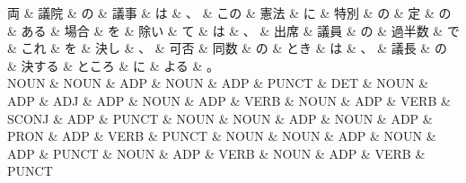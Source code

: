 \documentclass[tikz,border=5pt]{standalone}
\begin{document}
\small
\begin{dependency}[edge unit distance=10.4pt]
    \begin{deptext}[column sep=0.5em]
        両 \& 議院 \& の \& 議事 \& は \& 、 \& この \& 憲法 \& に \& 特別 \& の \& 定 \& の \& ある \& 場合 \& を \& 除い \& て \& は \& 、 \& 出席 \& 議員 \& の \& 過半数 \& で \& これ \& を \& 決し \& 、 \& 可否 \& 同数 \& の \& とき \& は \& 、 \& 議長 \& の \& 決する \& ところ \& に \& よる \& 。\\
        NOUN \& NOUN \& ADP \& NOUN \& ADP \& PUNCT \& DET \& NOUN \& ADP \& ADJ \& ADP \& NOUN \& ADP \& VERB \& NOUN \& ADP \& VERB \& SCONJ \& ADP \& PUNCT \& NOUN \& NOUN \& ADP \& NOUN \& ADP \& PRON \& ADP \& VERB \& PUNCT \& NOUN \& NOUN \& ADP \& NOUN \& ADP \& PUNCT \& NOUN \& ADP \& VERB \& NOUN \& ADP \& VERB \& PUNCT\\
    \end{deptext}
\end{dependency}
\end{document}
